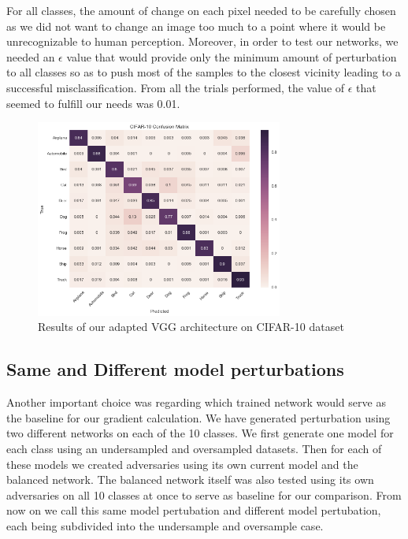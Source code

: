 \documentclass[runningheads,a4paper]{llncs}
\begin{document}
For all classes, the amount of change on each pixel needed to be carefully chosen as we did not want to change an image too much to a point where it would be unrecognizable to human perception. Moreover, in order to test our networks, we needed an $\epsilon$ value that would provide only the minimum amount of perturbation to all classes so as to push most of the samples to the closest vicinity leading to a successful misclassification. From all the trials performed, the value of $\epsilon$ that seemed to fulfill our needs was 0.01. 
\begin{figure}
	\centering
	\includegraphics[height=6.5cm]{conf_matrix.png}
	\caption{Results of our adapted VGG architecture on CIFAR-10 dataset}
	\label{fig:conf_matrix_full}
\end{figure}
\subsection{Same and Different model perturbations}
Another important choice was regarding which trained network would serve as the baseline for our gradient calculation. We have generated perturbation using two different networks on each of the 10 classes. We first generate one model for each class using an undersampled and oversampled datasets. Then for each of these models we created adversaries using its own current model and the balanced network. The balanced network itself was also tested using its own adversaries on all 10 classes at once to serve as baseline for our comparison. From now on we call this same model pertubation and different model pertubation, each being subdivided into the undersample and oversample case.
\end{document}
